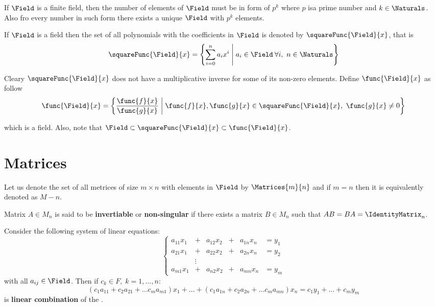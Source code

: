 \begin{theorem}
    If \(\Field\) is a finite field, then the number of elements of \(\Field\) must be in form of \(p^k\) where \(p\) isa prime number and \(k \in \Naturals\). Also fro every number in such form there exists a unique \(\Field\) with \(p^k\) elements.
\end{theorem}

If \(\Field\) is a field then the set of all polynomials with the coefficients in \(\Field\) is denoted by \(\squareFunc{\Field}{x}\), that is
\begin{equation*}
    \squareFunc{\Field}{x} = \left\{ \sum_{i = 0}^{n} a_i x^i \; \middle| \; a_i \in \Field \: \forall i,\ n \in \Naturals \right\}
\end{equation*}

Cleary \(\squareFunc{\Field}{x}\) does not have a multiplicative inverse for some of its non-zero elements. Define \(\func{\Field}{x}\) as follow
\begin{equation*}
    \func{\Field}{x} = \left\{ \frac{\func{f}{x}}{\func{g}{x}} \; \middle| \; \func{f}{x}, \func{g}{x} \in \squareFunc{\Field}{x}, \  \func{g}{x} \neq 0 \right\}
\end{equation*}

which is a field. Also, note that \(\Field \subset \squareFunc{\Field}{x} \subset \func{\Field}{x}\).
\section{Matrices}
Let us denote the set of all metrices of size \(m \times n\) with elements in \(\Field\) by \( \Matrices{m}{n} \) and if \(m = n\) then it is equivalently denoted as \(M-{n}\).

Matrix \(A \in M_{n}\) is said to be \textbf{invertiable} or \textbf{non-singular} if there exists a matrix \linebreak \(B \in M_{n}\) such that \(AB = BA = \IdentityMatrix_n\).

Consider the following system of linear equations:
\begin{equation}
    \left\{
    \begin{alignedat}{3} \label{eq:LinearEquation}
        a_{11}x_1 & +{} &  a_{12}x_2 & +{} & a_{1n}x_n & = y_1 \\
        a_{21}x_1 & +{} &  a_{22}x_2 & +{} & a_{2n}x_n & = y_2 \\
        & \vdots\\
        a_{m1}x_1 & +{} &  a_{n2}x_2 & +{} & a_{mn}x_n & = y_m
    \end{alignedat}
    \right.
\end{equation}
with all \(a_{ij} \in \Field\). Then if \(c_k \in F,\; k = 1, \dots, n\):
\begin{equation*}
    (c_1 a_{11} + c_2 a_{21} + \dots c_m a_{m1})x_1 + \dots + (c_1 a_{1n} + c_2 a_{2n} + \dots c_m a_{mn})x_n = c_1 y_1 + \dots + c_m y_m
\end{equation*}
is \textbf{linear combination} of the .

